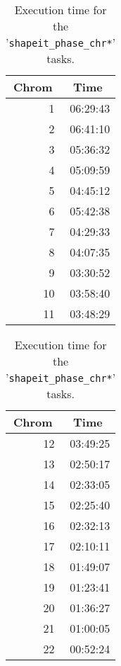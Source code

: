 \documentclass[10pt,twoside,english]{scrartcl}
\begin{document}
\begin{table}[H]
\protect\caption{Execution time for the '\texttt{shapeit\_phase\_chr*}' tasks.\label{tab:shapeit_phase_exec_time}}

\centering

\begin{tabular}{rr}
\hline 
\multicolumn{1}{c}{\textbf{Chrom}}
 & \multicolumn{1}{c}{\textbf{Time}}
\\
\hline 

1 & {\color{light_gray}0}6:29:43\\
2 & {\color{light_gray}0}6:41:10\\
3 & {\color{light_gray}0}5:36:32\\
4 & {\color{light_gray}0}5:09:59\\
5 & {\color{light_gray}0}4:45:12\\
6 & {\color{light_gray}0}5:42:38\\
7 & {\color{light_gray}0}4:29:33\\
8 & {\color{light_gray}0}4:07:35\\
9 & {\color{light_gray}0}3:30:52\\
10 & {\color{light_gray}0}3:58:40\\
11 & {\color{light_gray}0}3:48:29\\
\hline 
\end{tabular}
\hspace{1cm}
\begin{tabular}{rr}
\hline 
\multicolumn{1}{c}{\textbf{Chrom}}
 & \multicolumn{1}{c}{\textbf{Time}}
\\
\hline 

12 & {\color{light_gray}0}3:49:25\\
13 & {\color{light_gray}0}2:50:17\\
14 & {\color{light_gray}0}2:33:05\\
15 & {\color{light_gray}0}2:25:40\\
16 & {\color{light_gray}0}2:32:13\\
17 & {\color{light_gray}0}2:10:11\\
18 & {\color{light_gray}0}1:49:07\\
19 & {\color{light_gray}0}1:23:41\\
20 & {\color{light_gray}0}1:36:27\\
21 & {\color{light_gray}0}1:00:05\\
22 & {\color{light_gray}00:}52:24\\
\hline 
\end{tabular}


\end{table}
\end{document}
